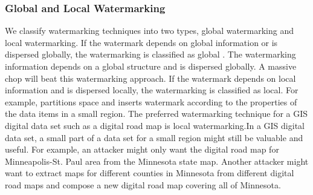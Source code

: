 \subsubsection{Global and Local Watermarking}
We classify watermarking techniques into two types, global
watermarking and local watermarking. If the watermark depends 
on global information or is dispersed globally, the watermarking 
is classified as global\cite{DBLP:conf/vldb/AgrawalK02}\cite{DBLP:conf/soda/KhannaZ00} 
\cite{DBLP:conf/iwdw/SionAP02}\cite{DBLP:conf/sigmod/SionAP03}. The watermarking 
information depends on a global structure and is dispersed globally. 
A massive chop will beat this watermarking approach. If the watermark 
depends on local information and is dispersed locally, the watermarking 
is classified as local. For example, \cite{DBLP:conf/soda/KhannaZ00} partitions 
space and inserts watermark according to the properties of the data items in a small region.
The preferred watermarking technique for a GIS digital data set such as 
a digital road map is local watermarking.In a GIS digital data set, 
a small part of a data set for a small region might still be valuable 
and useful. For example, an attacker might only want the digital road 
map for Minneapolis-St. Paul area from the Minnesota state map.
Another attacker might want to extract maps for different
counties in Minnesota from different digital road maps and
compose a new digital road map covering all of Minnesota.

